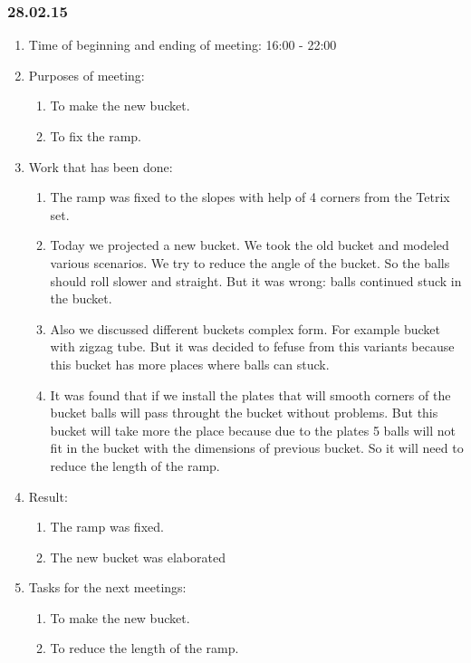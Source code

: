 \subsubsection{28.02.15}

\begin{enumerate}
	\item Time of beginning and ending of meeting:
	16:00 - 22:00
	\item Purposes of meeting:
	\begin{enumerate}
		\item To make the new bucket.
		
		\item To fix the ramp.
	  
    \end{enumerate}
   
	\item Work that has been done:
	\begin{enumerate}
		 
		 \item The ramp was fixed to the slopes with help of 4 corners from the Tetrix set.
		 
		 \item Today we projected a new bucket. We took the old bucket and modeled various scenarios. We try to reduce the angle of the bucket. So the balls should roll slower and straight. But it was wrong: balls continued stuck in the bucket.
		 
		 \item Also we discussed different buckets complex form. For example bucket with zigzag tube. But it was decided to fefuse from this variants because this bucket has more places where balls can stuck.
		 
		 \item It was found that if we install the plates that will smooth corners of the bucket balls will pass throught the bucket without problems. But this bucket will take more the place because due to the plates 5 balls will not fit in the bucket with the dimensions of previous bucket. So it will need to reduce the length of the ramp.
		 
    \end{enumerate}
    
	\item Result: 
	\begin{enumerate}
	  \item The ramp was fixed.
	  
	  \item The new bucket was elaborated
      
    \end{enumerate}
    
	\item Tasks for the next meetings:
	\begin{enumerate}
		
		\item To make the new bucket.
		
		\item To reduce the length of the ramp.
	  
    \end{enumerate}     
\end{enumerate}
\fillpage